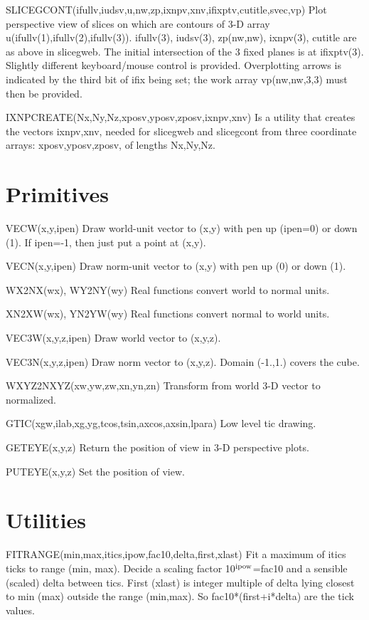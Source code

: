 \documentclass[12pt]{article}
\newif \iftth
\begin{document}
\iftth \special{html:<a href="slicetest.f"><img align="right"
src="sgcont.jpg" width="300"></a>}\fi

SLICEGCONT(ifullv,iudsv,u,nw,zp,ixnpv,xnv,ifixptv,cutitle,svec,vp) Plot
perspective view of slices on which are contours of 3-D array
u(ifullv(1),ifullv(2),ifullv(3)). ifullv(3), iudsv(3), zp(nw,nw),
ixnpv(3), cutitle are as above in slicegweb. The initial intersection
of the 3 fixed planes is at ifixptv(3). Slightly different
keyboard/mouse control is provided. Overplotting arrows is indicated
by the third bit of ifix being set; the work array vp(nw,nw,3,3)
must then be provided.

IXNPCREATE(Nx,Ny,Nz,xposv,yposv,zposv,ixnpv,xnv) Is a utility that
creates the vectors ixnpv,xnv, needed for slicegweb and slicegcont
from three coordinate arrays: xposv,yposv,zposv, of lengths Nx,Ny,Nz.

\section{Primitives}

VECW(x,y,ipen) Draw world-unit vector to (x,y) with pen up (ipen=0) or
down (1). If ipen=-1, then just put a point at (x,y).

VECN(x,y,ipen) Draw norm-unit vector to (x,y) with pen up (0) or down (1).

WX2NX(wx), WY2NY(wy) Real functions convert world to normal units.

XN2XW(wx), YN2YW(wy) Real functions convert normal to world units.

VEC3W(x,y,z,ipen) Draw world vector to (x,y,z).

VEC3N(x,y,z,ipen) Draw norm vector to (x,y,z). Domain (-1.,1.) covers
the cube.

WXYZ2NXYZ(xw,yw,zw,xn,yn,zn) Transform from world 3-D vector to
normalized.

GTIC(xgw,ilab,xg,yg,tcos,tsin,axcos,axsin,lpara) Low level tic drawing.

GETEYE(x,y,z) Return the position of view in 3-D perspective plots.

PUTEYE(x,y,z) Set the position of view.

\section{Utilities}

FITRANGE(min,max,itics,ipow,fac10,delta,first,xlast) Fit a maximum of
itics ticks to range (min, max). Decide a scaling factor 10$^{\rm
ipow}$=fac10 and a sensible (scaled) delta between tics. First (xlast)
is integer multiple of delta lying closest to min (max) outside the
range (min,max). So fac10*(first+i*delta) are the tick values.
\end{document}
